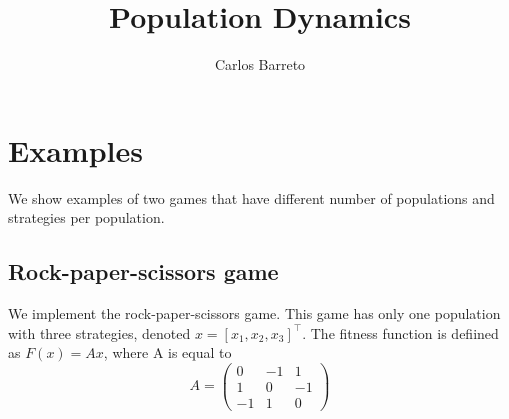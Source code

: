 \documentclass[a4paper,10pt]{article}
\title{Population Dynamics}
\author{Carlos Barreto}
\begin{document}
\maketitle


\section{Examples}
We show examples of two games that have different number of populations and strategies per population.

\subsection{Rock-paper-scissors game}
We implement the rock-paper-scissors game. This game has only one population with three strategies, denoted $x = [x_1, x_2, x_3]^\top$. The fitness function is defiined as $F(x)=Ax$, where A is equal to 
\begin{equation}
  A = \begin{pmatrix}
  0  & -1 &  1 \\
  1  &  0 & -1 \\
  -1 &  1 & 0
  \end{pmatrix}
\end{equation}
\end{document}
